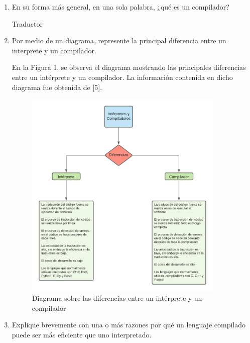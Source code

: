 \documentclass[12pt,a4paper]{article}
\begin{document}
\begin{enumerate}
    \item En su forma más general, en una sola palabra, ¿qué es un compilador?

    Traductor
    
    \vspace{35mm}
    
    \item Por medio de un diagrama, represente la principal diferencia entre un interprete y un compilador.
    
    En la Figura 1. se observa el diagrama mostrando las principales diferencias entre un intérprete y un compilador. La información contenida en dicho diagrama fue obtenida de [5].
    
    \begin{figure}[H]
    \centering
    \center
    \includegraphics[width=0.9\textwidth]{Fotos_Lab6/Interpretes y compiladores.png}
    \caption{Diagrama sobre las diferencias entre un intérprete y un compilador}
    \label{1}
\end{figure}
    
    \vspace{60mm}
    
    \item Explique brevemente con una o más razones por qué un lenguaje compilado puede ser más eficiente que uno interpretado.
    

\end{enumerate}
\end{document}
